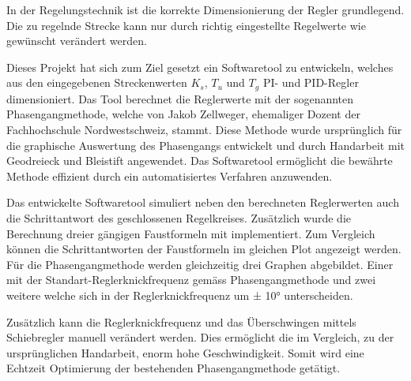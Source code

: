 In  der   Regelungstechnik  ist   die  korrekte  Dimensionierung   der  Regler
grundlegend. Die  zu  regelnde Strecke  kann  nur  durch richtig  eingestellte
Regelwerte wie gew\"unscht ver\"andert werden.

Dieses  Projekt hat  sich zum  Ziel  gesetzt ein  Softwaretool zu  entwickeln,
welches  aus  den  eingegebenen  Streckenwerten $K_s$,  $T_u$  und  $T_g$  PI-
und  PID-Regler  dimensioniert. Das Tool  berechnet  die  Reglerwerte mit  der
sogenannten   Phasengangmethode,  welche   von  Jakob   Zellweger,  ehemaliger
Dozent  der   Fachhochschule  Nordwestschweiz,  stammt. Diese   Methode  wurde
urspr\"unglich f\"ur die graphische  Auswertung des Phasengangs entwickelt und
durch  Handarbeit mit  Geodreieck und  Bleistift angewendet. Das  Softwaretool
erm\"oglicht  die  bew\"ahrte  Methode  effizient  durch  ein  automatisiertes
Verfahren anzuwenden.

Das  entwickelte Softwaretool  simuliert  neben  den berechneten  Reglerwerten
auch  die Schrittantwort  des  geschlossenen Regelkreises. Zus\"atzlich  wurde
die   Berechnung  dreier   g\"angigen   Faustformeln  mit   implementiert. Zum
Vergleich  k\"onnen die  Schrittantworten  der Faustformeln  im gleichen  Plot
angezeigt  werden.   F\"ur  die  Phasengangmethode  werden  gleichzeitig  drei
Graphen  abgebildet. Einer   mit  der   Standart-Reglerknickfrequenz  gem\"ass
Phasengangmethode und zwei weitere welche sich in der Reglerknickfrequenz um ±
10° unterscheiden.

Zus\"atzlich  kann die  Reglerknickfrequenz  und  das \"Uberschwingen  mittels
Schiebregler manuell  ver\"andert werden. Dies erm\"oglicht die  im Vergleich,
zu  der urspr\"unglichen  Handarbeit, enorm  hohe Geschwindigkeit. Somit  wird
eine Echtzeit Optimierung der bestehenden Phasengangmethode get\"atigt.
